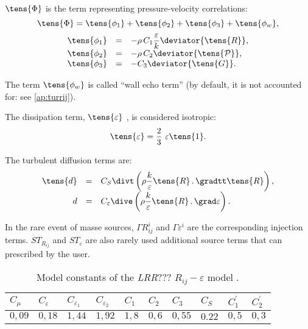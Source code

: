 $\tens{\Phi}$ is the term representing pressure-velocity correlations:
\begin{equation}
\displaystyle \tens{\Phi} = \tens{\phi_{1}}+ \tens{\phi_{2}}+ \tens{\phi_{3}}+ \tens{\phi_{w}},
\end{equation}%
%
\begin{equation}
\begin{array}{r c l}
\tens{\phi_{1}} &=& \displaystyle -\rho \,C_{1}\frac{\varepsilon }{k}%
\deviator{\tens{R}}, \\
\tens{\phi_{2}} &=& -\rho \,C_{2} 
\deviator{\tens{\mathcal{P}}}, \\
\tens{\phi_{3}} &=& -C_{3} \deviator{ \tens{G} }.
\end{array}
\end{equation}

The term $\tens{\phi_{w}}$ is called ``wall echo term'' (by default, it is not
accounted for: see  \ref{ap:turrij}).

The dissipation term, $\tens{\varepsilon}$ , is considered isotropic:
\begin{equation}
\displaystyle \tens{\varepsilon}=\frac{2}{3}\ \varepsilon \tens{1}.
\end{equation}

The turbulent diffusion terms are:
\begin{equation}
\begin{array}{r c l}
\tens{d} & = & C_{S} \displaystyle \divt \left( \rho \frac{k}{\varepsilon }%
\tens{R} \, . \, \gradtt \tens{R} \right), \\
d & = & C_{\varepsilon }\displaystyle \dive \left( \rho \frac{k}{\varepsilon} 
\tens{R} \, . \, \grad \varepsilon \right).
\end{array}
\end{equation}

In the rare event of masse sources, $\Gamma R_{ij}^{i}$ and $\Gamma
\varepsilon ^{i}$ are the corresponding injection terms. $ST_{R_{ij}}$ and $%
ST_{\varepsilon }$ are also rarely used additional source terms that can
prescribed by the user.

\begin{table}[!htp]
\begin{center}
\begin{tabular}{p{}|p{}|p{}|p{}|p{}|p{}|p{}|p{}|p{}|p{}}
$C_\mu$ & $C_{\varepsilon}$ & $C_{\varepsilon_1}$ & $C_{\varepsilon_2}$ & $%
C_1$ & $C_2$ & $C_3$ & $C_S$ & $C^{\prime}_1$ & $C^{\prime}_2$ \\ \hline
$0,09$ & $0,18$ & $1,44$ & $1,92$ & $1,8$ & $0,6$ & $0,55$ & $0.22$ & $0,5$
& $0,3$ 
\end{tabular}
\end{center}
\caption{Model constants of the \emph{LRR}??? $R_{ij}-\varepsilon$ model \cite{Launder:????}.}
\end{table}


